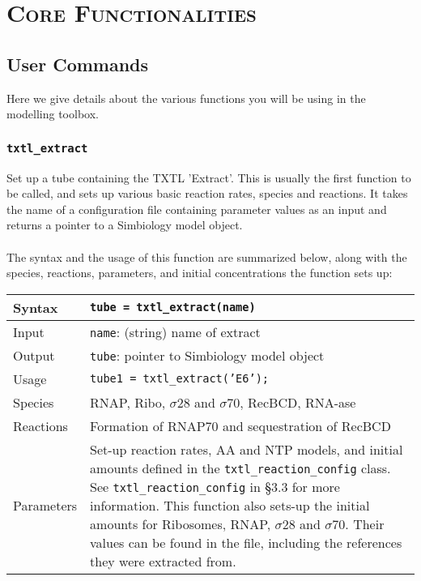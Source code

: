 \chapter{\textsc{Core Functionalities}} 
	\section{User Commands}	
	Here we give details about the various functions you will be using in the modelling toolbox. 	

		\subsection*{\texttt{txtl\_extract}}
			Set up a tube containing the TXTL 'Extract'. This is usually the first function to be called, and sets up various basic reaction rates, species and reactions. It takes the name of a configuration file containing parameter values as an input and returns a pointer to a Simbiology model object.  \\	
			\\
			The syntax and the usage of this function are summarized below, along with the species, reactions, parameters, and initial concentrations the function sets up:
			
			\begin{tabular}{p{2cm}|p{13cm}}
			Syntax & \texttt{tube = txtl\_extract(name)}\\ \hline
			Input & \texttt{name}: (string) name of extract \\ \hline
			Output & \texttt{tube}: pointer to Simbiology model object\\ \hline
			Usage & \texttt{tube1 = txtl\_extract('E6');}\\ \hline
			Species & RNAP, Ribo, $\sigma 28$ and $\sigma 70$, RecBCD, RNA-ase \\ \hline
			Reactions & Formation of RNAP70 and sequestration of RecBCD \\ \hline
			Parameters & Set-up reaction rates, AA and NTP models, and initial amounts defined in the \texttt{txtl\_reaction\_config} class. See \texttt{txtl\_reaction\_config} in \S 3.3 for more information. This function also sets-up the initial amounts for Ribosomes, RNAP,  $\sigma 28$ and $\sigma 70$. Their values can be found in the file, including the references they were extracted from. \\
			\end{tabular}
			

